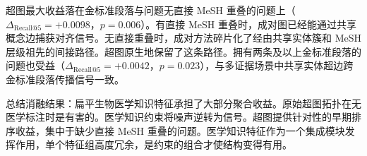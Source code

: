 

超图最大收益落在金标准段落与问题无直接 MeSH 重叠的问题上（$\Delta_{\text{Recall@5}} = +0.0098$，$p=0.006$）。有直接 MeSH 重叠时，成对图已经能通过共享概念边捕获对齐信号。无直接重叠时，成对方法碎片化了经由共享实体簇和 MeSH 层级祖先的间接路径。超图原生地保留了这条路径。拥有两条及以上金标准段落的问题也受益（$\Delta_{\text{Recall@5}} = +0.0042$，$p=0.023$），与多证据场景中共享实体超边跨金标准段落传播信号一致。

总结消融结果：扁平生物医学知识特征承担了大部分聚合收益。原始超图拓扑在无医学标注时是有害的。医学知识约束将噪声逆转为信号。超图提供针对性的早期排序收益，集中于缺少直接 MeSH 重叠的问题。医学知识特征作为一个集成模块发挥作用，单个特征组高度冗余，是约束的组合才使结构变得有用。
